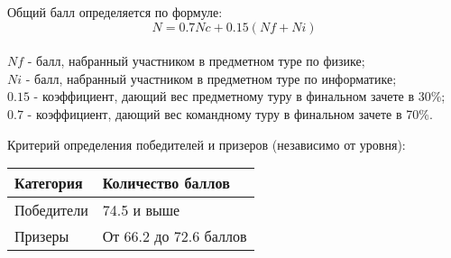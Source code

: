 Общий балл определяется по формуле:
$$N = 0.7Nc +0.15(Nf + Ni)$$\\
$Nf$ - балл, набранный участником в предметном туре по физике;\\
$Ni$ - балл, набранный участником в предметном туре по информатике;\\
$0.15$ - коэффициент, дающий вес предметному туру в финальном зачете в 30\%;\\
$0.7$ - коэффициент, дающий вес командному туру в финальном зачете в 70\%.

Критерий определения победителей и призеров (независимо от уровня):
\begin{center}
    \begin{tabular}{|l|l|}
        \hline
        Категория&Количество баллов\\
        \hline
        Победители&74.5 и выше\\
        \hline
        Призеры&От 66.2 до 72.6 баллов\\
        \hline
    \end{tabular}
\end{center}
